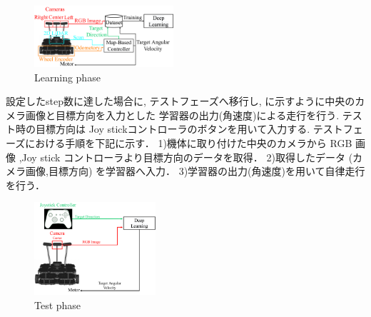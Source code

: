 \documentclass[10pt]{jarticle}
\begin{document}
    \begin{center}
        \begin{figure}[h]
            \centering
            \includegraphics[width=0.46\textwidth]{./fig/system_learning.pdf}
            \caption{Learning phase}
            \label{fig:system_learning}
        \end{figure}
    \end{center}
    
    
    設定したstep数に達した場合に, テストフェーズへ移行し,
    に示すように中央のカメラ画像と目標方向を入力とした
    学習器の出力(角速度)による走行を行う.
    テスト時の目標方向は Joy stickコントローラのボタンを用いて入力する.
    テストフェーズにおける手順を下記に示す．
    1)機体に取り付けた中央のカメラから RGB 画像 ,Joy stick コントローラより目標方向のデータを取得．
    2)取得したデータ (カメラ画像,目標方向) を学習器へ入力．
    3)学習器の出力(角速度)を用いて自律走行を行う．
    \begin{center}
        \begin{figure}[h]
            \centering
            \includegraphics[width=0.40\textwidth]{./fig/system_test.pdf}
            \caption{Test phase}
            \label{fig:system_test}
        \end{figure}
    \end{center}
    \vspace{-1zh}
\end{document}
